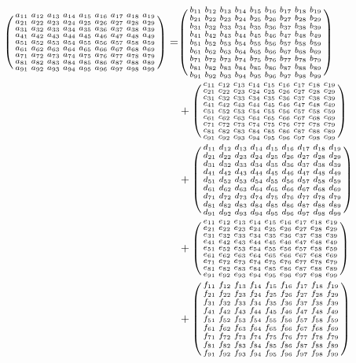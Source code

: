 \documentclass{ctexbeamer}
\begin{document}
\begin{frame}
    \begin{align*}
        \smqty(\xmat*{a}{9}{9})
        = & \smqty(\xmat*{b}{9}{9})   \\
          & + \smqty(\xmat*{c}{9}{9}) \\
          & + \smqty(\xmat*{d}{9}{9}) \\
          & + \smqty(\xmat*{e}{9}{9}) \\
          & + \smqty(\xmat*{f}{9}{9}) \\
    \end{align*}
\end{frame}
\end{document}
